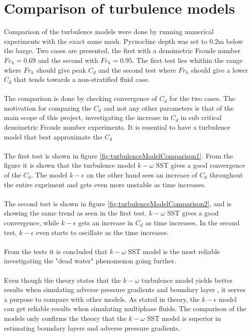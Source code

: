 \documentclass[a4paper, 12pt]{report}
\begin{document}
\section{Comparison of turbulence models}
Comparison of the turbulence models were done by running numerical experiments with the exact same mesh. Pycnocline depth was set to $0.2$m below the barge. Two cases are presented, the first with a densimetric Froude number $Fr_h=0.69$ and the second with $Fr_h=0.95$. The first test lies whithin the range where $Fr_h$ should give peak $C_d$ and the second test where $Fr_h$ should give a lower $C_d$ that tends towards a non-stratified fluid case.\\
\\
The comparison is done by checking convergence of $C_d$ for the two cases. The motivation for comparing the $C_d$ and not any other parameters is that of the main scope of this project, investigating the increase in $C_d$ in sub critical densimetric Froude number experiments. It is essential to have a turbulence model that best approximate the $C_d$ \\
\\
The first test is shown in figure \ref{fig:turbulenceModelComparison1}. From the figure it is shown that the turbulence model $k-\omega$ SST gives a good convergence of the $C_d$. The model $k-\epsilon$ on the other hand sees an increace of $C_d$ throughout the entire expriment and gets even more unstable as time increases.\\
\\
The second test is shown in figure \ref{fig:turbulenceModelComparison2}, and is showing the same trend as seen in the first test. $k-\omega$ SST gives a good convergence, while $k-\epsilon$ gets an increase in $C_d$ as time increases. In the second test, $k-\epsilon$ even starts to oscillate as the time increases.\\
\\
From the tests it is concluded that $k-\omega$ SST model is the most reliable investigating the "dead water" phenomenon going further.\\
\\
Even though the theory states that the $k-\omega$ turbulence model yields better results when simulating adverse pressure gradients and boundary layer \cite{CFD}, it serves a purpose to compare with other models. As stated in theory, the $k-\epsilon$ model can get reliable results when simulating multiphase fluids. The comparison of the models only confirms the theory that the $k-\omega$ SST model is superior in estimating boundary layers and adverse pressure gradients.\\
\end{document}
